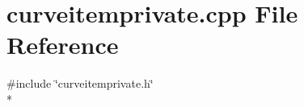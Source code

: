 \section{curveitemprivate.\+cpp File Reference}
\label{bk3_2curve_2curveitemprivate_8cpp}
{\ttfamily \#include \char`\"{}curveitemprivate.\+h\char`\"{}}\\*
